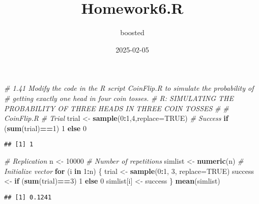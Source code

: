 \documentclass[
]{article}
\title{Homework6.R}
\author{boosted}
\date{2025-02-05}
\newenvironment{Shaded}{\begin{snugshade}}{\end{snugshade}}
\newcommand{\AttributeTok}[1]{\textcolor[rgb]{0.13,0.29,0.53}{#1}}
\newcommand{\CommentTok}[1]{\textcolor[rgb]{0.56,0.35,0.01}{\textit{#1}}}
\newcommand{\ConstantTok}[1]{\textcolor[rgb]{0.56,0.35,0.01}{#1}}
\newcommand{\ControlFlowTok}[1]{\textcolor[rgb]{0.13,0.29,0.53}{\textbf{#1}}}
\newcommand{\DecValTok}[1]{\textcolor[rgb]{0.00,0.00,0.81}{#1}}
\newcommand{\FunctionTok}[1]{\textcolor[rgb]{0.13,0.29,0.53}{\textbf{#1}}}
\newcommand{\NormalTok}[1]{#1}
\newcommand{\OtherTok}[1]{\textcolor[rgb]{0.56,0.35,0.01}{#1}}
\newcommand{\SpecialCharTok}[1]{\textcolor[rgb]{0.81,0.36,0.00}{\textbf{#1}}}
\begin{document}
\maketitle

\begin{Shaded}
\begin{Highlighting}[]
\CommentTok{\# 1.41 Modify the code in the R script CoinFlip.R to simulate the probability of}
\CommentTok{\# getting exactly one head in four coin tosses.}
\CommentTok{\# R: SIMULATING THE PROBABILITY OF THREE HEADS IN THREE COIN TOSSES}
\CommentTok{\#}
\CommentTok{\# CoinFlip.R}
\CommentTok{\# Trial}
\NormalTok{trial }\OtherTok{\textless{}{-}} \FunctionTok{sample}\NormalTok{(}\DecValTok{0}\SpecialCharTok{:}\DecValTok{1}\NormalTok{,}\DecValTok{4}\NormalTok{,}\AttributeTok{replace=}\ConstantTok{TRUE}\NormalTok{)}
\CommentTok{\# Success}
\ControlFlowTok{if}\NormalTok{ (}\FunctionTok{sum}\NormalTok{(trial)}\SpecialCharTok{==}\DecValTok{1}\NormalTok{) }\DecValTok{1} \ControlFlowTok{else} \DecValTok{0}
\end{Highlighting}
\end{Shaded}

\begin{verbatim}
## [1] 1
\end{verbatim}

\begin{Shaded}
\begin{Highlighting}[]
\CommentTok{\# Replication}
\NormalTok{n }\OtherTok{\textless{}{-}} \DecValTok{10000} \CommentTok{\# Number of repetitions}
\NormalTok{simlist }\OtherTok{\textless{}{-}} \FunctionTok{numeric}\NormalTok{(n) }\CommentTok{\# Initialize vector}
\ControlFlowTok{for}\NormalTok{ (i }\ControlFlowTok{in} \DecValTok{1}\SpecialCharTok{:}\NormalTok{n) \{}
\NormalTok{  trial }\OtherTok{\textless{}{-}} \FunctionTok{sample}\NormalTok{(}\DecValTok{0}\SpecialCharTok{:}\DecValTok{1}\NormalTok{, }\DecValTok{3}\NormalTok{, }\AttributeTok{replace=}\ConstantTok{TRUE}\NormalTok{)}
\NormalTok{  success }\OtherTok{\textless{}{-}} \ControlFlowTok{if}\NormalTok{ (}\FunctionTok{sum}\NormalTok{(trial)}\SpecialCharTok{==}\DecValTok{3}\NormalTok{) }\DecValTok{1} \ControlFlowTok{else} \DecValTok{0}
\NormalTok{  simlist[i] }\OtherTok{\textless{}{-}}\NormalTok{ success \}}
\FunctionTok{mean}\NormalTok{(simlist)}
\end{Highlighting}
\end{Shaded}

\begin{verbatim}
## [1] 0.1241
\end{verbatim}
\end{document}
